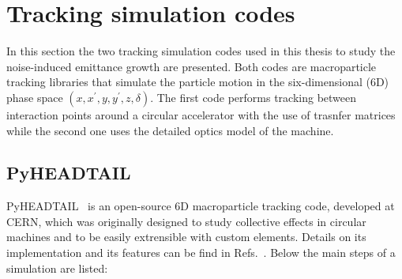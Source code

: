 {{\section{Tracking simulation codes}\label{sec:simualtion_codes}
In this section the two tracking simulation codes used in this thesis to study the noise-induced emittance growth are presented. Both codes are macroparticle tracking libraries that simulate the particle motion in the six-dimensional (6D) phase space $(x, x^\prime, y, y^\prime, z, \delta)$. The first code performs tracking between interaction points around a circular accelerator with the use of trasnfer matrices while the second one uses the detailed optics model of the machine.

\subsection{PyHEADTAIL}\label{subsec:pyheadtail}

PyHEADTAIL~\cite{pyheadtail_repository} is an open-source 6D macroparticle tracking code, developed at CERN, which was originally designed to study collective effects in circular machines and to be easily extrensible with custom elements. 
Details on its implementation and its features can be find in Refs.~\cite{pyheadtail_manual_adrian, pyheadtail_schenk}. Below the main steps of a simulation are listed: %


}}
